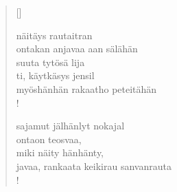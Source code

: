\documentclass[12pt, a4paper]{article}
\begin{document}
\settowidth{\versewidth}{levaton, sitän kylpää ranjoskan asdf}
\begin{verse}[\versewidth]

näitäys rautaitran \\
ontakan anjavaa aan sälähän \\
suuta tytösä lija \\
ti, käytkäsys jensil \\
myöshänhän rakaatho peteitähän \\!



sajamut jälhänlyt nokajal \\
ontaon teosvaa, \\
miki näity hänhänty, \\
javaa, rankaata keikirau sanvanrauta \\!


\end{verse}
\newpage
\end{document}

